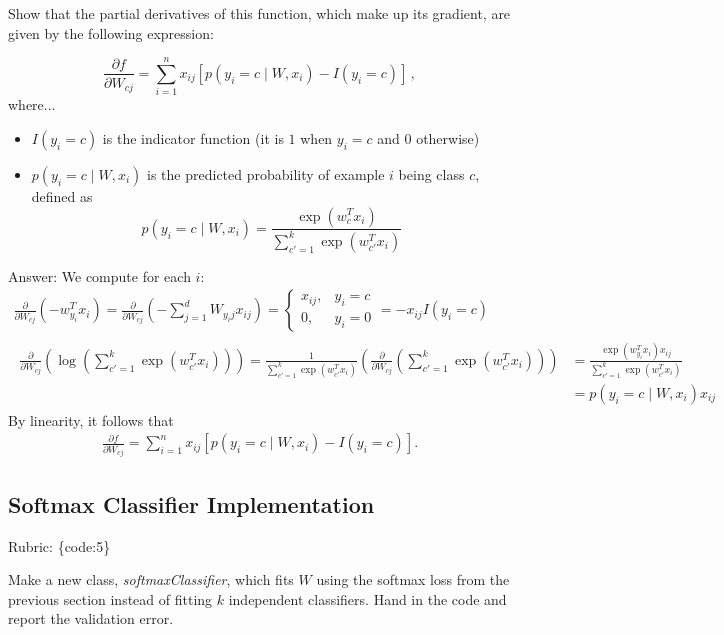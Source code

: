 \documentclass{article}
\def\rubric#1{\gre{Rubric: \{#1\}}}{}
\def\blu#1{{\color{blu}#1}}
\def\gre#1{{\color{gre}#1}}
\def\ans#1{\gre{Answer: #1}}{}
\begin{document}
\blu{Show that the partial derivatives of this function, which make up its gradient, are given by the following expression:}

\[
\frac{\partial f}{\partial W_{cj}} = \sum_{i=1}^n x_{ij}[p(y_i=c \mid W,x_i) - I(y_i = c)] \, ,
\]
where...
\begin{itemize}
	\item $I(y_i = c)$ is the indicator function (it is $1$ when $y_i=c$ and $0$ otherwise)
	\item $p(y_i=c \mid W, x_i)$ is the predicted probability of example $i$ being class $c$, defined as
	\[
	p(y_i=c \mid W, x_i) = \frac{\exp(w_c^Tx_i)}{\sum_{c'=1}^k\exp(w_{c'}^Tx_i)}
	\]
	
\end{itemize}

\ans{We compute for each $i$:
	\begin{gather*}
	\frac{\partial}{\partial W_{cj}} \left( -w_{y_i}^T x_i \right) = \frac{\partial}{\partial W_{cj}} \left( -\sum_{j=1}^d W_{y_ij}x_{ij} \right) =
	\begin{cases}
	x_{ij}, & y_i = c \\
	0, & y_i = 0
	\end{cases} = -x_{ij}I(y_i = c) \\
	\begin{split}
	\frac{\partial}{\partial W_{cj}} \left( \log \left( \sum_{c'=1}^k \exp(w_{c'}^T x_i) \right) \right)
	= \frac{1}{\sum_{c'=1}^k \exp(w_{c'}^T x_i)} \left( \frac{\partial}{\partial W_{cj}} \left( \sum_{c'=1}^k \exp(w_{c'}^T x_i) \right) \right)
	&= \frac{\exp(w_{y_i}^Tx_i)x_{ij}}{\sum_{c'=1}^k \exp(w_{c'}^T x_i)} \\
	&= p(y_i = c \mid W,x_i)x_{ij}
	\end{split}
	\end{gather*}
	By linearity, it follows that
	\begin{gather*}
	\frac{\partial f}{\partial W_{cj}} = \sum_{i=1}^n x_{ij}[p(y_i=c \mid W,x_i) - I(y_i = c)].
	\end{gather*}
}

\subsection{Softmax Classifier Implementation}
\rubric{code:5}

Make a new class, \emph{softmaxClassifier}, which fits $W$ using the softmax loss from the previous section instead of fitting $k$ independent classifiers. \blu{Hand in the code and report the validation error}.
\end{document}
